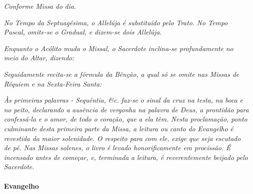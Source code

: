 \emph{Conforme Missa do dia.}

\textit{No Tempo da Septuagésima, o Allelúja é substituído pelo Trato. No Tempo Pascal, omite-se o Gradual, e dizem-se dois Allelúja.}

\textit{Enquanto o Acólito muda o Missal, o Sacerdote inclina-se profundamente no meio do Altar, dizendo:}

\begin{paracol}{2}\switchcolumn{}\end{paracol}

\textit{Seguidamente recita-se a fórmula da Bênção, a qual só se omite nas Missas de Réquiem e na Sexta-Feira Santa:}

\begin{paracol}{2}\switchcolumn{}\end{paracol}

\textit{Às primeiras palavras - Sequéntia, \&c. faz-se o sinal da cruz na testa, na boca e no peito, declarando a ausência de vergonha na palavra de Deus, a prontidão para confessá-la e o amor, de todo o coração, que a ela têm. Nesta proclamação, ponto culminante desta primeira parte da Missa, a leitura ou canto do Evangelho é revestida da maior solenidade. O respeito para com ele, exige que seja escutado de pé. Nas Missas solenes, o livro é levado honorificamente em procissão. É incensado antes de começar, e, terminada a leitura, é reverentemente beijado pelo Sacerdote.}

\paragraph{Evangelho}


